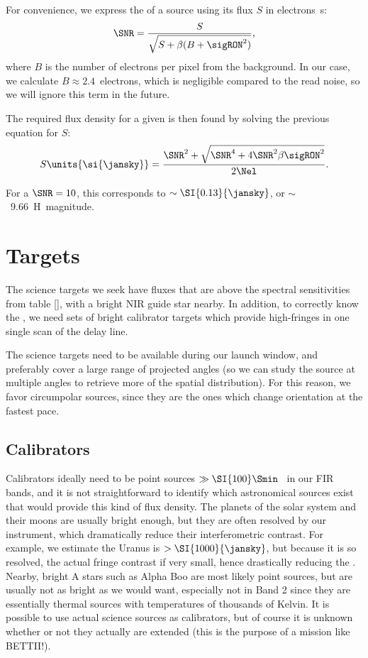 For convenience, we express the \SNR of a source using its flux $S$ in electrons\si{\per\second}:
\begin{align}
\SNR = \frac{S}{\sqrt{S + \beta(B + \sigRON^2)}},
\end{align}
where $B$ is the number of electrons per pixel from the background. In our case, we calculate $B\approx 2.4$~electrons, which is negligible compared to the read noise, so we will ignore this term in the future.

The required flux density for a given \SNR is then found by solving the previous equation for $S$:
\begin{align}
S\units{\si{\jansky}} = \frac{\SNR^2 + \sqrt{\SNR^4 + 4\SNR^2\beta\sigRON^2}}{2\Nel}.
\end{align}

For a $\SNR=10$, this corresponds to $\sim\SI{0.13}{\jansky}$, or $\sim$~9.66~H~magnitude. 

\section{Targets}

The science targets we seek have fluxes that are above the spectral sensitivities from table [], with a bright NIR guide star nearby. In addition, to correctly know the \OPD, we need sets of bright calibrator targets which provide high-\SNR fringes in one single scan of the delay line.

The science targets need to be available during our launch window, and preferably cover a large range of projected angles (so we can study the source at multiple angles to retrieve more of the spatial distribution). For this reason, we favor circumpolar sources, since they are the ones which change orientation at the fastest pace.


\subsection{Calibrators}

Calibrators ideally need to be point sources $\gg\SI{100}\Smin$~\si{\jansky} in our FIR bands, and it is not straightforward to identify which astronomical sources exist that would provide this kind of flux density. The planets of the solar system and their moons are usually bright enough, but they are often resolved by our instrument, which dramatically reduce their interferometric contrast. For example, we estimate the Uranus is $>\SI{1000}{\jansky}$, but because it is so resolved, the actual fringe contrast if very small, hence drastically reducing the \SNR. Nearby, bright A stars such as Alpha Boo are most likely point sources, but are usually not as bright as we would want, especially not in Band 2 since they are essentially thermal sources with temperatures of thousands of Kelvin. It is possible to use actual science sources as calibrators, but of course it is unknown whether or not they actually are extended (this is the purpose of a mission like BETTII!). 

